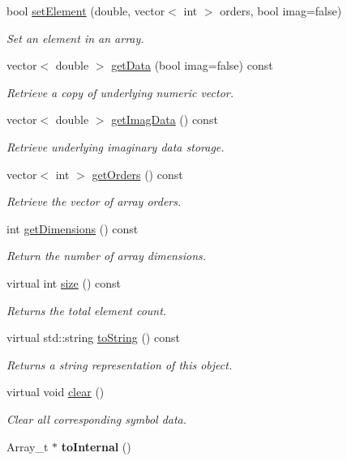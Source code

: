 \begin{DoxyCompactItemize}
bool \hyperlink{class_g_e_array_a0e89787df523a69a1834c89adcfdfc3f}{set\+Element} (double, vector$<$ int $>$ orders, bool imag=false)
\begin{DoxyCompactList}\small\item\em Set an element in an array. \end{DoxyCompactList}\item 
vector$<$ double $>$ \hyperlink{class_g_e_array_a5489786a71cad6eb7482658564bac5f2}{get\+Data} (bool imag=false) const
\begin{DoxyCompactList}\small\item\em Retrieve a copy of underlying numeric vector. \end{DoxyCompactList}\item 
vector$<$ double $>$ \hyperlink{class_g_e_array_a13a837cc6784562be80f64e4aa3ce4a5}{get\+Imag\+Data} () const
\begin{DoxyCompactList}\small\item\em Retrieve underlying imaginary data storage. \end{DoxyCompactList}\item 
vector$<$ int $>$ \hyperlink{class_g_e_array_a1a0335f73a61e044895f40a8dc89b4c6}{get\+Orders} () const
\begin{DoxyCompactList}\small\item\em Retrieve the vector of array orders. \end{DoxyCompactList}\item 
int \hyperlink{class_g_e_array_a5823413a0fa7b8bb6a021441c5f21311}{get\+Dimensions} () const
\begin{DoxyCompactList}\small\item\em Return the number of array dimensions. \end{DoxyCompactList}\item 
virtual int \hyperlink{class_g_e_array_aedc9a359a4353dd8a430b048d526ce1f}{size} () const
\begin{DoxyCompactList}\small\item\em Returns the total element count. \end{DoxyCompactList}\item 
virtual std\+::string \hyperlink{class_g_e_array_a9f5b44db0f65c13c2ac15dc119b81459}{to\+String} () const
\begin{DoxyCompactList}\small\item\em Returns a string representation of this object. \end{DoxyCompactList}\item 
virtual void \hyperlink{class_g_e_array_ad7fd6880da03d11c13387ea9e1e1cd5d}{clear} ()
\begin{DoxyCompactList}\small\item\em Clear all corresponding symbol data. \end{DoxyCompactList}\item 
\mbox{\label{class_g_e_array_a9426f0cb4b6a03677a2a868dae66e935}} 
Array\+\_\+t $\ast$ {\bfseries to\+Internal} ()
\end{DoxyCompactItemize}
